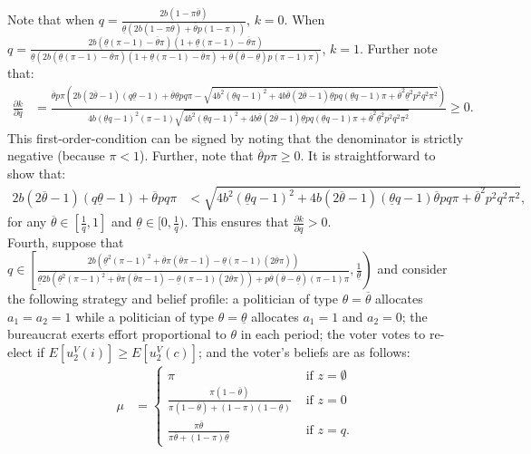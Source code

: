 \documentclass[11pt,english]{article}
\begin{document}
Note that when $q = \frac{2b (1 - \pi \overline{\theta})}{\underline{\theta}(2b(1-\pi \overline{\theta})+\overline{\theta}p(1-\pi))}$, $k = 0$. When $q = \frac{2b(\underline{\theta}(\pi - 1)-\overline{\theta}\pi)(1+\underline{\theta}(\pi - 1)-\overline{\theta}\pi)}{\underline{\theta}\left(2b(\underline{\theta}(\pi - 1)-\overline{\theta}\pi)(1+\underline{\theta}(\pi - 1)-\overline{\theta}\pi) + \overline{\theta}(\overline{\theta}-\underline{\theta})p(\pi-1)\pi\right)}$, $k = 1$. Further note that:
\begin{align*}
\frac{\partial k}{\partial q} &= \frac{\overline{\theta}p \pi \left(2b(2\overline{\theta} -1)(q\underline{\theta}-1)+\overline{\theta}\underline{\theta}pq\pi-\sqrt{4b^2(\underline{\theta}q-1)^2+ 4b\overline{\theta}(2\overline{\theta}-1)\underline{\theta}pq(\underline{\theta}q-1)\pi + \overline{\theta}^2\underline{\theta}^2p^2q^2\pi^2}\right)}{4b(\underline{\theta}q-1)^2(\pi-1)\sqrt{4b^2(\underline{\theta}q-1)^2+ 4b\overline{\theta}(2\overline{\theta}-1)\underline{\theta}pq(\underline{\theta}q-1)\pi + \overline{\theta}^2\underline{\theta}^2p^2q^2\pi^2}} \geq 0.
\end{align*}
This first-order-condition can be signed by noting that the denominator is strictly negative (because $\pi < 1$). Further, note that $\overline{\theta}p\pi\geq 0$. It is straightforward to show that:
\begin{align*}
2b(2\overline{\theta} -1)(q\underline{\theta}-1)+\overline{\theta}pq\pi &<\sqrt{4b^2(\underline{\theta}q-1)^2+ 4b(2\overline{\theta}-1)(\underline{\theta}q-1)\overline{\theta}pq\pi + \overline{\theta}^2p^2q^2\pi^2},
\end{align*}
for any $\overline{\theta}\in [\frac{1}{q}, 1]$ and $\underline{\theta}\in [0, \frac{1}{q})$. This ensures that $\frac{\partial k}{\partial q}>0$.\\


Fourth, suppose that $q \in \left[\frac{2b(\underline{\theta}^2(\pi-1)^2 + \overline{\theta}\pi(\overline{\theta}\pi - 1)-\underline{\theta}(\pi - 1)(2\overline{\theta}\pi))}{\underline{\theta}2b(\underline{\theta}^2(\pi-1)^2 + \overline{\theta}\pi(\overline{\theta}\pi - 1)-\underline{\theta}(\pi - 1)(2\overline{\theta}\pi)) + p\overline{\theta}(\overline{\theta}-\underline{\theta})(\pi -1)\pi}, \frac{1}{\underline{\theta}}\right)$ and consider the following strategy and belief profile: a politician of type $\theta = \overline{\theta}$ allocates $a_1 = a_2 = 1$ while a politician of type $\theta = \underline{\theta}$ allocates $a_1 = 1$ and $a_2 = 0$;  the bureaucrat exerts effort proportional to $\theta$ in each period; the voter votes to re-elect if $E[u_2^V(i)] \geq E[u_2^V(c)]$; and the voter's beliefs are as follows:
\begin{align}\label{mu4}
\mu &= \begin{cases}
\pi & \text{ if } z = \emptyset\\
\frac{\pi(1-\overline{\theta})}{\pi(1-\overline{\theta}) + (1-\pi)(1-\underline{\theta})} & \text{ if }z = 0\\
\frac{\pi \overline{\theta}}{\pi \overline{\theta} + (1-\pi)\underline{\theta}} & \text{ if }z = q.
\end{cases}
\end{align}
\end{document}
